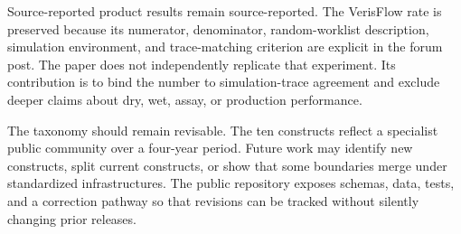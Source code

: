 Source-reported product results remain source-reported. The VerisFlow rate is preserved because its numerator, denominator, random-worklist description, simulation environment, and trace-matching criterion are explicit in the forum post. The paper does not independently replicate that experiment. Its contribution is to bind the number to simulation-trace agreement and exclude deeper claims about dry, wet, assay, or production performance.

The taxonomy should remain revisable. The ten constructs reflect a specialist public community over a four-year period. Future work may identify new constructs, split current constructs, or show that some boundaries merge under standardized infrastructures. The public repository exposes schemas, data, tests, and a correction pathway so that revisions can be tracked without silently changing prior releases.
